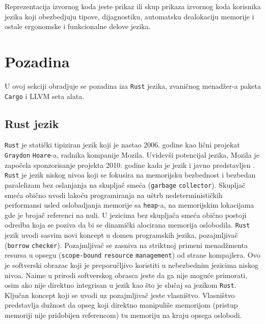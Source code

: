 \documentclass[11pt]{article}
\begin{document}
Reprezentacija izvornog koda jeste prikaz ili skup prikaza izvornog koda korisnika jezika koji obezbedjuju tipove, dijagnostiku,
automatsku dealokaciju memorije i ostale ergonomske i funkcionalne delove jezika.
\newpage

\section{Pozadina}

U ovoj sekciji obradjuje se pozadina iza \verb|Rust| jezika, zvaničnog menadžer-a paketa \verb|Cargo| i 
LLVM seta alata.

\subsection{Rust jezik}

\verb|Rust| je statički tipiziran jezik koji je nastao 2006. godine kao lični projekat \verb|Graydon| \verb|Hoare|-a, radnika kompanije 
Mozila. Uvidevši potencijal jezika, Mozila je započela sponzorisanje projekta 2010. godine kada je jezik i javno 
predstavljen \cite{rust-language}. \verb|Rust| je jezik niskog nivoa koji se fokusira na memorijsku bezbednost
i bezbedan paralelizam bez oslanjanja na skupljač smeća (\verb|garbage| \verb|collector|). Skupljač smeća 
obično uvodi lakoću programiranja na uštrb nedeterminističkih performansi usled oslobadjanja memorije 
sa \verb|heap|-a, na memorijskim lokacijama gde je brojač referenci na nuli. U jezicima bez skupljača 
smeća obično postoji odredba koja se poziva da bi se dinamički alocirana memorija oslobodila. \verb|Rust|
jezik uvodi sasvim novi koncept u domen programskih jezika, pozajmljivač (\verb|borrow| \verb|checker|).
Pozajmljivač se zasniva na striktnoj primeni menadžmenta resursa u opsegu (\verb|scope-bound| \verb|resource| \verb|management|) 
od strane kompajlera. Ovo je softverski obrazac koji je preporučljivo koristiti u nebezbednim jezicima 
niskog nivoa. Naime u prirodi softverskog obrasca jeste da ga nije moguće primorati, osim ako nije direktno
integrisan u jezik kao što je slučaj sa jezikom \verb|Rust|. Ključan koncept koji se uvodi uz pozajmljivač 
jeste vlasništvo. Vlasništvo predstavlja dužnost da opseg koji direktno manipuliše memorijom (pristup memoriji nije 
pridobijen referencom) tu memoriju na kraju opsega oslobodi. 
\end{document}
